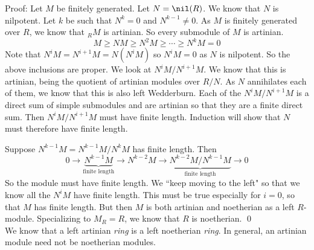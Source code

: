 Proof: Let $M$ be finitely generated. Let $N=\nil(R)$. We know that $N$ is nilpotent. Let $k$ be such that $N^k=0$ and $N^{k-1} \neq 0$. As $M$ is finitely generated over $R$, we know that $_R M$ is artinian. So every submodule of $M$ is artinian. 
\[
M \geq NM \geq N^2M \geq \cdots \geq N^kM=0
\]
Note that $N^iM=N^{i+1}M=N(N^iM)$ so $N^iM=0$ as $N$ is nilpotent. So the above inclusions are proper. We look at $N^iM/N^{i+1}M$. We know that this is artinian, being the quotient of artinian modules over $R/N$. As $N$ annihilates each of them, we know that this is also left Wedderburn. Each of the $N^iM/N^{i+1}M$ is a direct sum of simple submodules and are artinian so that they are a finite direct sum. Then $N^iM/N^{i+1}M$ must have finite length. Induction will show that $N$ must therefore have finite length.

Suppose $N^{k-1}M=N^{k-1}M/N^kM$ has finite length. Then
\[
0 \longrightarrow \underbrace{N^{k-1}M}_{\text{finite length}} \longrightarrow N^{k-2}M \longrightarrow \underbrace{N^{k-2}M/N^{k-1}M}_{\text{finite length}} \longrightarrow 0
\]
So the module must have finite length. We ``keep moving to the left" so that we know all the $N^iM$ have finite length. This must be true especially for $i=0$, so that $M$ has finite length. But then $M$ is both artinian and noetherian as a left $R$-module. Specializing to $M_R=R$, we know that $R$ is noetherian. \qed \\

We know that a left artinian \emph{ring} is a left noetherian \emph{ring}. In general, an artinian module need not be noetherian modules. 


































